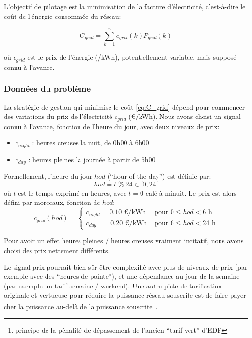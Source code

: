 \documentclass[a4paper,10pt,twocolumn]{article}
\begin{document}
L'objectif de pilotage est la minimisation de la facture d'électricité,
c'est-à-dire le coût de l'énergie consommée du réseau:

\begin{equation} \label{eq:C_grid}
  C_{grid} = \sum_{k=1}^{n} c_{grid}(k)P_{grid}(k)
\end{equation}

où $c_{grid}$ est le prix de l'énergie (\texteuro/kWh), potentiellement variable,
mais supposé connu à l'avance.

\subsubsection{Données du problème}
\label{sss:fixed_var}

La stratégie de gestion qui minimise le coût \eqref{eq:C_grid}
dépend pour commencer des variations du prix de l'électricité $c_{grid}$ (€/kWh).
Nous avons choisi un signal connu à l'avance, fonction de l'heure du jour,
avec deux niveaux de prix:
\begin{itemize}
 \item $c_{night}$ : heures creuses la nuit, de 0h00 à 6h00
 \item $c_{day}$ : heures pleines la journée à partir de 6h00
\end{itemize}

Formellement, l'heure du jour $hod$ (``hour of the day'') est définie par:
%
\begin{equation} \label{eq:hod}
  hod = t \; \% \; 24 \in [0, 24[
\end{equation} 
où $t$ est le temps exprimé en heures, avec $t=0$ calé à minuit.
Le prix est alors défini par morceaux, fonction de $hod$:
\begin{equation}
  c_{grid}(hod) = \begin{cases}
    c_{night} = 0.10 \text{ €/kWh} & \text{ pour } 0 \leq hod < 6\text{ h}\\
    c_{day} \;\;\,  = 0.20 \text{ €/kWh} & \text{ pour } 6 \leq hod < 24\text{ h}
  \end{cases}
\end{equation}

Pour avoir un effet heures pleines / heures creuses vraiment incitatif,
nous avons choisi des prix nettement différents.

Le signal prix pourrait bien sûr être complexifié avec plus de niveaux de prix
(par exemple avec des ``heures de pointe''), et une dépendance au jour de la semaine
(par exemple un tarif semaine / weekend).
Une autre piste de tarification originale et vertueuse pour réduire la puissance réseau souscrite
est de faire payer cher la puissance au-delà de la puissance souscrite\footnote{
  principe de la pénalité de dépassement de l'ancien ``tarif vert'' d'EDF}.
\end{document}
